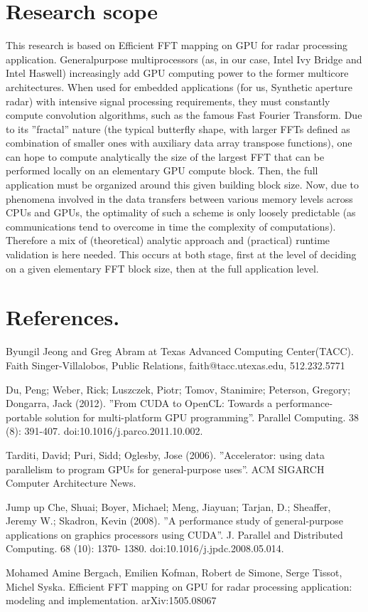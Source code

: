 \documentclass{article}
\begin{document}
\section{Research scope}
{
This research is based on Efficient FFT mapping on GPU for radar processing application. Generalpurpose
multiprocessors (as, in our case, Intel Ivy Bridge and Intel Haswell) increasingly add GPU
computing power to the former multicore architectures. When used for embedded applications (for
us, Synthetic aperture radar) with intensive signal processing requirements, they must constantly
compute convolution algorithms, such as the famous Fast Fourier Transform. Due to its ”fractal”
nature (the typical butterfly shape, with larger FFTs defined as combination of smaller ones with
auxiliary data array transpose functions), one can hope to compute analytically the size of the largest
FFT that can be performed locally on an elementary GPU compute block. Then, the full application
must be organized around this given building block size. Now, due to phenomena involved in the
data transfers between various memory levels across CPUs and GPUs, the optimality of such a
scheme is only loosely predictable (as communications tend to overcome in time the complexity of
computations). Therefore a mix of (theoretical) analytic approach and (practical) runtime validation
is here needed. This occurs at both stage, first at the level of deciding on a given elementary FFT
block size, then at the full application level.
}


\section{References.}
{Byungil Jeong and Greg Abram at Texas Advanced Computing Center(TACC).
Faith Singer-Villalobos, Public Relations, faith@tacc.utexas.edu, 512.232.5771


Du, Peng; Weber, Rick; Luszczek, Piotr; Tomov, Stanimire; Peterson, Gregory; Dongarra, Jack
(2012). ”From CUDA to OpenCL: Towards a performance-portable solution for multi-platform
GPU programming”. Parallel Computing. 38 (8): 391-407. doi:10.1016/j.parco.2011.10.002.


Tarditi, David; Puri, Sidd; Oglesby, Jose (2006). ”Accelerator: using data parallelism to program
GPUs for general-purpose uses”. ACM SIGARCH Computer Architecture News.


Jump up Che, Shuai; Boyer, Michael; Meng, Jiayuan; Tarjan, D.; Sheaffer, Jeremy W.; Skadron,
Kevin (2008). ”A performance study of general-purpose applications on graphics processors using
CUDA”. J. Parallel and Distributed Computing. 68 (10): 1370- 1380. doi:10.1016/j.jpdc.2008.05.014.


Mohamed Amine Bergach, Emilien Kofman, Robert de Simone, Serge Tissot, Michel Syska.
Efficient FFT mapping on GPU for radar processing application: modeling and implementation.
arXiv:1505.08067
}
\end{document}
